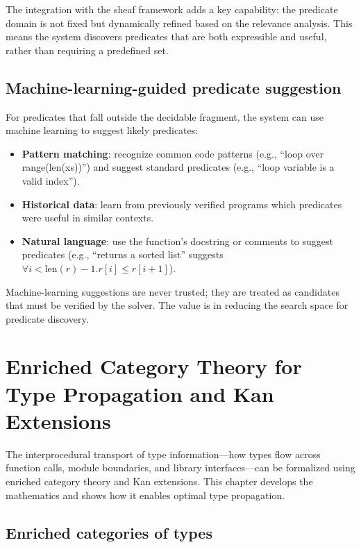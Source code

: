 \documentclass[11pt]{report}
\theoremstyle{definition}
\theoremstyle{plain}
\begin{document}
The integration with the sheaf framework adds a key capability: the predicate
domain is not fixed but dynamically refined based on the relevance analysis.
This means the system discovers predicates that are both expressible and
useful, rather than requiring a predefined set.

\section{Machine-learning-guided predicate suggestion}

For predicates that fall outside the decidable fragment, the system can use
machine learning to suggest likely predicates:

\begin{itemize}[nosep]
  \item \textbf{Pattern matching}: recognize common code patterns (e.g.,
        ``loop over range(len(xs))'') and suggest standard predicates
        (e.g., ``loop variable is a valid index'').
  \item \textbf{Historical data}: learn from previously verified programs
        which predicates were useful in similar contexts.
  \item \textbf{Natural language}: use the function's docstring or comments
        to suggest predicates (e.g., ``returns a sorted list'' suggests
        $\forall i < \mathrm{len}(r)-1. r[i] \leq r[i+1]$).
\end{itemize}

Machine-learning suggestions are never trusted; they are treated as
candidates that must be verified by the solver. The value is in reducing the
search space for predicate discovery.

\chapter{Enriched Category Theory for Type Propagation and Kan Extensions}

The interprocedural transport of type information---how types flow across
function calls, module boundaries, and library interfaces---can be formalized
using enriched category theory and Kan extensions. This chapter develops the
mathematics and shows how it enables optimal type propagation.

\section{Enriched categories of types}
\end{document}
